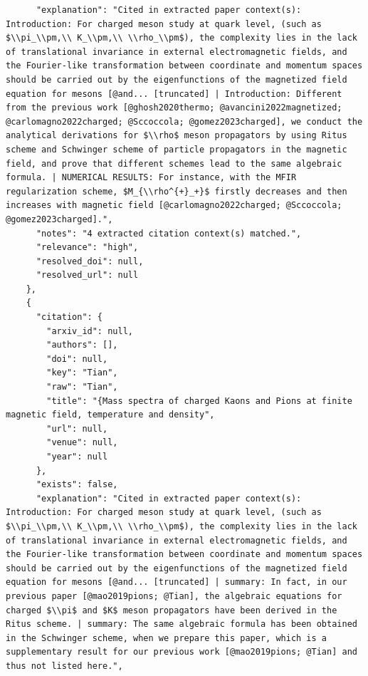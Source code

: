 \documentclass[11pt]{article}
\begin{document}
\begin{verbatim}
      "explanation": "Cited in extracted paper context(s): Introduction: For charged meson study at quark level, (such as $\\pi_\\pm,\\ K_\\pm,\\ \\rho_\\pm$), the complexity lies in the lack of translational invariance in external electromagnetic fields, and the Fourier-like transformation between coordinate and momentum spaces should be carried out by the eigenfunctions of the magnetized field equation for mesons [@and... [truncated] | Introduction: Different from the previous work [@ghosh2020thermo; @avancini2022magnetized; @carlomagno2022charged; @Sccoccola; @gomez2023charged], we conduct the analytical derivations for $\\rho$ meson propagators by using Ritus scheme and Schwinger scheme of particle propagators in the magnetic field, and prove that different schemes lead to the same algebraic formula. | NUMERICAL RESULTS: For instance, with the MFIR regularization scheme, $M_{\\rho^{+}_+}$ firstly decreases and then increases with magnetic field [@carlomagno2022charged; @Sccoccola; @gomez2023charged].",
      "notes": "4 extracted citation context(s) matched.",
      "relevance": "high",
      "resolved_doi": null,
      "resolved_url": null
    },
    {
      "citation": {
        "arxiv_id": null,
        "authors": [],
        "doi": null,
        "key": "Tian",
        "raw": "Tian",
        "title": "{Mass spectra of charged Kaons and Pions at finite magnetic field, temperature and density",
        "url": null,
        "venue": null,
        "year": null
      },
      "exists": false,
      "explanation": "Cited in extracted paper context(s): Introduction: For charged meson study at quark level, (such as $\\pi_\\pm,\\ K_\\pm,\\ \\rho_\\pm$), the complexity lies in the lack of translational invariance in external electromagnetic fields, and the Fourier-like transformation between coordinate and momentum spaces should be carried out by the eigenfunctions of the magnetized field equation for mesons [@and... [truncated] | summary: In fact, in our previous paper [@mao2019pions; @Tian], the algebraic equations for charged $\\pi$ and $K$ meson propagators have been derived in the Ritus scheme. | summary: The same algebraic formula has been obtained in the Schwinger scheme, when we prepare this paper, which is a supplementary result for our previous work [@mao2019pions; @Tian] and thus not listed here.",

\end{verbatim}
\end{document}
